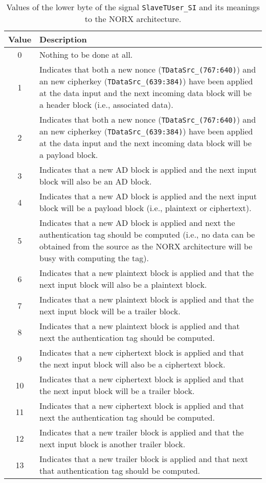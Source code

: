 \begin{longtable}{@{}cX@{}}
  \caption{Values of the lower byte of the signal
    \texttt{SlaveTUser\_SI} and its meanings to the NORX
    architecture.}
 \label{tbl:tusersrc_values} \\
 \toprule
  \textbf{Value} & \textbf{Description} \\
	\midrule
  0 & %
  Nothing to be done at all. \\
	\midrule
  1 & %
  Indicates that both a new nonce (\texttt{TDataSrc\_(767:640)}) and
  an new cipherkey (\texttt{TDataSrc\_(639:384)}) have been applied at
  the data input and the next incoming data block will be a header
  block (i.e., associated data). \\
  2 & %
  Indicates that both a new nonce (\texttt{TDataSrc\_(767:640)}) and
  an new cipherkey (\texttt{TDataSrc\_(639:384)}) have been applied at
  the data input and the next incoming data block will be a payload
  block. \\ \midrule
  3 & %
  Indicates that a new AD block is applied and the next input block
  will also be an AD block. \\
  4 & %
  Indicates that a new AD block is applied and the next input block
  will be a payload block (i.e., plaintext or ciphertext). \\
  5 & %
  Indicates that a new AD block is applied and next the authentication
  tag should be computed (i.e., no data can be obtained from the
  source as the NORX architecture will be busy with computing the
  tag). \\ \midrule
  6 & %
  Indicates that a new plaintext block is applied and that the next
  input block will also be a plaintext block. \\
  7 & %
  Indicates that a new plaintext block is applied and that the next
  input block will be a trailer block. \\
  8 & %
  Indicates that a new plaintext block is applied and that next the
  authentication tag should be computed. \\ \midrule
  9 & %
  Indicates that a new ciphertext block is applied and that the next
  input block will also be a ciphertext block. \\
  10 & %
  Indicates that a new ciphertext block is applied and that the next
  input block will be a trailer block. \\
  11 & %
  Indicates that a new ciphertext block is applied and that next the
  authentication tag should be computed. \\ \midrule
  12 & %
  Indicates that a new trailer block is applied and that the next
  input block is another trailer block. \\
  13 & %
  Indicates that a new trailer block is applied and that next that
  authentication tag should be computed. \\
  \bottomrule
\end{longtable}


